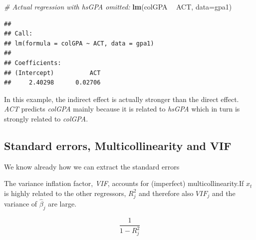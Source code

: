\documentclass[]{book}
\newenvironment{Shaded}{\begin{snugshade}}{\end{snugshade}}
\newcommand{\CommentTok}[1]{\textcolor[rgb]{0.56,0.35,0.01}{\textit{#1}}}
\newcommand{\DataTypeTok}[1]{\textcolor[rgb]{0.13,0.29,0.53}{#1}}
\newcommand{\KeywordTok}[1]{\textcolor[rgb]{0.13,0.29,0.53}{\textbf{#1}}}
\newcommand{\NormalTok}[1]{#1}
\newcommand{\OperatorTok}[1]{\textcolor[rgb]{0.81,0.36,0.00}{\textbf{#1}}}
\newcommand{\StringTok}[1]{\textcolor[rgb]{0.31,0.60,0.02}{#1}}
\begin{document}
\begin{Shaded}
\begin{Highlighting}[]
\CommentTok{# Actual regression with hsGPA omitted:}
\KeywordTok{lm}\NormalTok{(colGPA }\OperatorTok{~}\StringTok{ }\NormalTok{ACT, }\DataTypeTok{data=}\NormalTok{gpa1)}
\end{Highlighting}
\end{Shaded}

\begin{verbatim}
## 
## Call:
## lm(formula = colGPA ~ ACT, data = gpa1)
## 
## Coefficients:
## (Intercept)          ACT  
##     2.40298      0.02706
\end{verbatim}

In this example, the indirect effect is actually stronger than the
direct effect. \emph{ACT} predicts \emph{colGPA} mainly because it is
related to \emph{hsGPA} which in turn is strongly related to
\emph{colGPA}.

\hypertarget{standard-errors-multicollinearity-and-vif}{%
\subsection{Standard errors, Multicollinearity and
VIF}\label{standard-errors-multicollinearity-and-vif}}

We know already how we can extract the standard errors

\begin{Shaded}
\end{Shaded}

The variance inflation factor, \emph{VIF}, accounts for (imperfect)
multicollinearity.If \(x_t\) is highly related to the other regressors,
\(R^2_j\) and therefore also \(VIF_j\) and the variance of
\(\hat\beta_j\) are large.

\begin{equation}
\frac{1}{1-R^2_j}
\label{eq:VIF}
\end{equation}

\begin{Shaded}
\end{Shaded}
\end{document}
